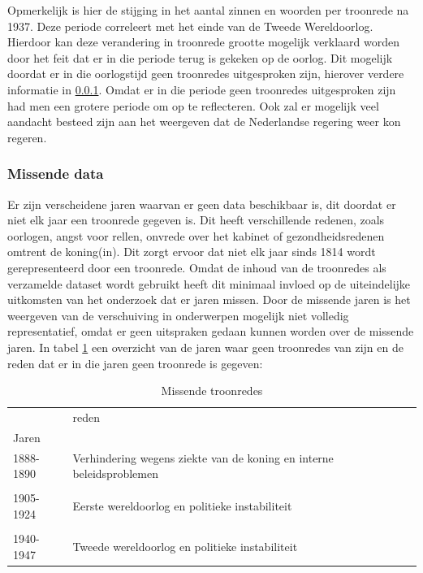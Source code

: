 Opmerkelijk is hier de stijging in het aantal zinnen en woorden per troonrede na 1937. Deze periode correleert met het einde van de Tweede Wereldoorlog. Hierdoor kan deze verandering in troonrede grootte mogelijk verklaard worden door het feit dat er in die periode terug is gekeken op de oorlog. Dit mogelijk doordat er in die oorlogstijd geen troonredes uitgesproken zijn, hierover verdere informatie in \ref{sssec 1}. Omdat er in die periode geen troonredes uitgesproken zijn had men een grotere periode om op te reflecteren. Ook zal er mogelijk veel aandacht besteed zijn aan het weergeven dat de Nederlandse regering weer kon regeren.

\subsubsection{Missende data} \label{sssec 1}
Er zijn verscheidene jaren waarvan er geen data beschikbaar is, dit doordat er niet elk jaar een troonrede gegeven is. Dit heeft verschillende redenen, zoals oorlogen, angst voor rellen, onvrede over het kabinet of gezondheidsredenen omtrent de koning(in). Dit zorgt ervoor dat niet elk jaar sinds 1814 wordt gerepresenteerd door een troonrede. Omdat de inhoud van de troonredes als verzamelde dataset wordt gebruikt heeft dit minimaal invloed op de uiteindelijke uitkomsten van het onderzoek dat er jaren missen. Door de missende jaren is het weergeven van de verschuiving in onderwerpen mogelijk niet volledig representatief, omdat er geen uitspraken gedaan kunnen worden over de missende jaren.
In tabel \ref{missing} een overzicht van de jaren waar geen troonredes van zijn en de reden dat er in die jaren geen troonrede is gegeven:

\begin{table}[H]
\centering
\begin{tabular}{ll}
\toprule
{} &                       reden \\
Jaren     &                             \\
\midrule
1888-1890 &  Verhindering wegens ziekte van de koning en interne beleidsproblemen\\
\\
1905-1924 &         Eerste wereldoorlog en politieke instabiliteit\\
\\
1940-1947 &         Tweede wereldoorlog en politieke instabiliteit\\
\bottomrule
\end{tabular}
\caption{Missende troonredes}
\label{missing}
\end{table}

